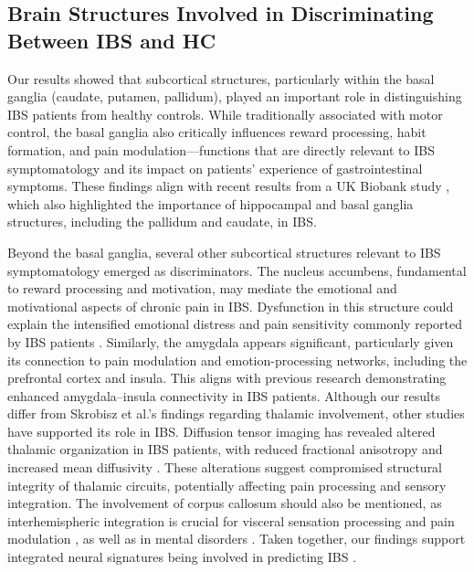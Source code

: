 \documentclass[diagnostics,article,accept,pdftex,moreauthors]{Definitions/mdpi}
\begin{document}
\subsection{Brain Structures Involved in Discriminating Between IBS and HC}

Our results showed that subcortical structures, particularly within the basal ganglia (caudate, putamen, pallidum), played an important role in distinguishing IBS patients from healthy controls. While traditionally associated with motor control, the basal ganglia also critically influences reward processing, habit formation, and pain modulation---functions that are directly relevant to IBS symptomatology and its impact on patients' experience of gastrointestinal symptoms. These findings align with recent results from a UK Biobank study \cite{li2024irritable}, which also highlighted the importance of hippocampal and basal ganglia structures, including the pallidum and caudate, in IBS.

Beyond the basal ganglia, several other subcortical structures relevant to IBS symptomatology emerged as discriminators. The nucleus accumbens, fundamental to reward processing and motivation, may mediate the emotional and motivational aspects of chronic pain in IBS. Dysfunction in this structure could explain the intensified emotional distress and pain sensitivity commonly reported by IBS patients \cite{lundervold2024decoding}. Similarly, the amygdala appears significant, particularly given its connection to pain modulation and emotion-processing networks, including the prefrontal cortex and insula. This aligns with previous research \cite{qi2016abnormal} demonstrating enhanced amygdala--insula connectivity in IBS patients. Although our results differ from Skrobisz et al.'s \cite{Skrobisz2022} findings regarding thalamic involvement, other studies have supported its role in IBS. Diffusion tensor imaging has revealed altered thalamic organization in IBS patients, with reduced fractional anisotropy and increased mean diffusivity \cite{ellingson2013diffusion}. These alterations suggest compromised structural integrity of thalamic circuits, potentially affecting pain processing and sensory integration. The involvement of corpus callosum should also be mentioned, as interhemispheric integration is crucial for visceral sensation processing and pain modulation \cite{ito2025interhemispheric}, as well as in mental disorders \cite{piras2021corpus}. Taken together, our findings support integrated neural signatures being involved in predicting IBS \cite{bhatt2022neuropsychosocial}. 
\end{document}
